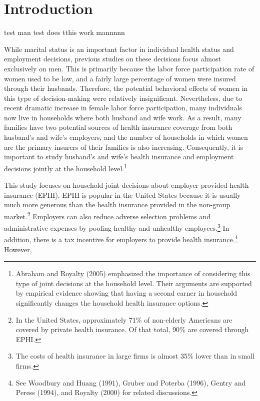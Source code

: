 \documentclass[legno,11pt]{article}
\begin{document}


\newpage
\section{Introduction}\label{section1}
test man test
does tthis work mannnnn

While marital status is an important factor in individual health
status and employment decisions, previous studies on these decisions
focus almost exclusively on men. This is primarily because the labor
force participation rate of women used to be low, and a fairly large
percentage of women were insured through their husbands. Therefore,
the potential behavioral effects of women in this type of
decision-making were relatively insignificant. Nevertheless, due to
recent dramatic increase in female labor force participation, many
individuals now live in households where both husband and wife work.
As a result, many families have two potential sources of health
insurance coverage from both husband's and wife's employers, and the
number of households in which women are the primary insurers of
their families is also increasing. Consequently, it is important to
study husband's and wife's health insurance and employment decisions
jointly at the household level.\footnote{Abraham and Royalty (2005)
emphasized the importance of considering this type of joint
decisions at the household level. Their arguments are supported by
empirical evidence showing that having a second earner in household
significantly changes the household health insurance options. }
\par
This study focuses on household joint decisions about
employer-provided health insurance (EPHI). EPHI is popular in the
United States because it is usually much more generous than the
health insurance provided in the non-group market.\footnote{In the
United States, approximately 71\% of non-elderly Americans are
covered by private health insurance. Of that total, 90\% are covered
through EPHI.} Employers can also reduce adverse selection problems
and administrative expenses by pooling healthy and unhealthy
employees.\footnote{The costs of health insurance in large firms is
almost 35\% lower than in small firms.} In addition, there is a tax
incentive for employers to provide health insurance.\footnote{See
Woodbury and Huang (1991), Gruber and Poterba (1996), Gentry and
Peress (1994), and Royalty (2000) for related discussions.} However,
\end{document}
